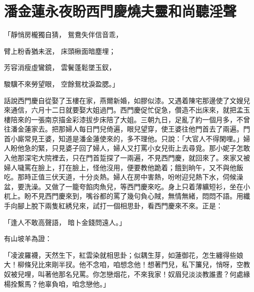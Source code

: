%

\chapter{潘金蓮永夜盼西門慶\KG 燒夫靈和尚聽淫聲}

\begin{showcontents}{}



「靜悄房櫳獨自猜，  鴛鴦失伴信音乖，

臂上粉香猶未泯，  床頭楸面暗塵埋；

芳容消瘦虛鸞鏡，  雲鬢蓬鬆墜玉釵，

駿驥不來勞望眼，  空餘鴛枕淚盈腮。」

話說西門慶自從娶了玉樓在家，燕爾新婚，如膠似漆。又遇着陳宅那邊使了文嫂兒來通信，六月十二日就要娶大姐過門。西門慶促忙促急，儹造不出床來，就把孟玉樓陪來的一張南京描金彩漆拔步床陪了大姐。三朝九日，足亂了約一個月多，不曾往潘金蓮家去。把那婦人每日門兒倚遍，眼兒望穿，使王婆往他門首去了兩遍。門首小廝常見王婆，知道是潘金蓮使來的，多不理他。只說：「大官人不得閑哩。」婦人盼他急的緊，只見婆子回了婦人，婦人又打罵小女兒街上去尋覓。那小妮子怎敢入他那深宅大院裡去，只在門首踅探了一兩遍，不見西門慶，就回來了。來家又被婦人噦罵在臉上，打在臉上，怪他沒用，便要教他跪着；餓到晌午，又不與他飯吃。那時正值三伏天道，十分炎熱。婦人在房中害熱，吩咐迎兒熱下水，伺候澡盆，要洗澡。又做了一籠夸餡肉魚兒，等西門慶來吃。身上只着薄纊短衫，坐在小杌上。盼不見西門慶來到，嘴谷都的罵了幾句負心賊，無情無緒，悶悶不語。用纖手向腳上脫下兩隻紅綉兒來，試打一個相思卦，看西門慶來不來。正是：

「逢人不敢高聲語，  暗卜金錢問遠人。」

有山坡羊為證：

「凌波羅襪，天然生下，紅雲染就相思卦；似耦生芽，如蓮御花，怎生纏得些娘大！柳條兒比來剛半扠。他不念咱，咱想念他！想著門兒，私下簾兒，悄呀，空教奴被兒哩，叫著他那名兒罵。你怎戀烟花，不來我家！奴眉兒淡淡教誰晝？何處緣楊拴繫馬？他辜負咱，咱念戀他。」


\end{showcontents}
